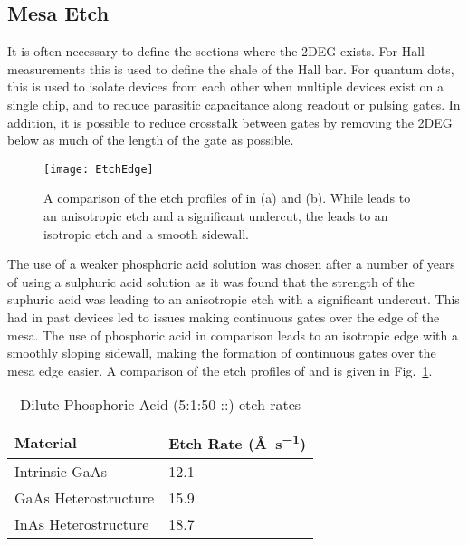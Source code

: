 \subsection{Mesa Etch}
\label{sec:mesaetch}
It is often necessary to define the sections where the 2DEG exists. For Hall measurements this is used to define the shale of the Hall bar.
For quantum dots, this is used to isolate devices from each other when multiple devices exist on a single chip, and to reduce parasitic
capacitance along readout or pulsing gates. In addition, it is possible to reduce crosstalk between gates by removing the 2DEG below
as much of the length of the gate as possible\cite{doi:10.1063/1.4752863}.

\begin{figure}
    \texttt{[image: EtchEdge]}
    \caption[Etch profile of  and ]
    {\label{fig:etchedge}A comparison of the etch profiles of  in (a) and  (b). While  leads
    to an anisotropic etch and a significant undercut, the  leads to an isotropic etch and a smooth sidewall.}
\end{figure}

The use of a weaker phosphoric acid solution was chosen after a number of years of using a sulphuric acid solution as it was found that the
strength of the suphuric acid was leading to an anisotropic etch with a significant undercut. This had in past devices led to issues making
continuous gates over the edge of the mesa. The use of phosphoric acid in comparison leads to
an isotropic edge with a smoothly sloping sidewall, making the formation of continuous gates over the mesa edge easier.
A comparison of the etch profiles of  and  is given in Fig.~\ref{fig:etchedge}.

\begin{table}
    \centering
    \begin{tabular}{|l|l|}
        \hline
        Material & Etch Rate (\si{\angstrom\per\second}) \\
        \hline
        Intrinsic GaAs & 12.1 \\ \hline
        GaAs Heterostructure & 15.9 \\ \hline
        InAs Heterostructure & 18.7 \\
        \hline
    \end{tabular}
    \caption[Dilute Phosphoric Acid (5:1:50 ::) etch rates]
    {Dilute Phosphoric Acid (5:1:50 ::) etch rates}
    \label{tab:etchratess}
\end{table}

